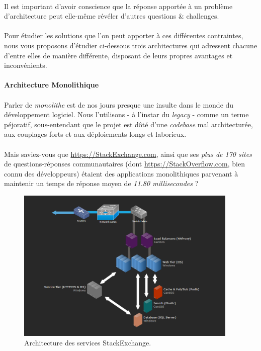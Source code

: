 \paragraph{} Il est important d'avoir conscience que la réponse apportée à un problème d'architecture peut elle-même révéler 
d'autres questions \& challenges.

\paragraph{} Pour étudier les solutions que l'on peut apporter à ces différentes contraintes, nous vous proposons d'étudier
ci-dessous trois architectures qui adressent chacune d'entre elles de manière différente, disposant de leurs propres
avantages et inconvénients.


\paragraph{Architecture Monolithique}

\paragraph{} Parler de \emph{monolithe} est de nos jours presque une insulte dans le monde du développement logiciel. Nous 
l'utilisons - à l'instar du \emph{legacy} - comme un terme péjoratif, sous-entendant que le projet est dôté d'une \emph{codebase}
mal architecturée, aux couplages forts et aux déploiements longs et laborieux.

\paragraph{} Mais saviez-vous que \url{https://StackExchange.com}, ainsi que ses \emph{plus de 170 sites} de questions-réponses
communautaires (dont \url{https://StackOverflow.com}, bien connu des développeurs) étaient des applications monolithiques 
parvenant à maintenir un temps de réponse moyen de \emph{11.80 millisecondes} \cite{Microservices7} ?

\begin{figure}[ht]
    \centering
    \includegraphics[width=400px]{chapters/02/images/stackexchange.png}
    \caption{\label{stackexchange_architecture}Architecture des services StackExchange.}
\end{figure}

